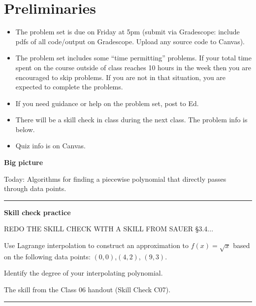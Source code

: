 \documentclass[12pt,letterpaper,noanswers]{exam}
\begin{document}
 \pdfpageheight 11in 
  \pdfpagewidth 8.5in

\noindent 

\section*{Preliminaries}

\begin{itemize}
\itemsep0pt
\item The problem set is due on Friday at 5pm (submit via Gradescope: include pdfs of all code/output on Gradescope.  Upload any source code to Canvas).
\item The problem set includes some ``time permitting'' problems.  If your total time spent on the course outside of class reaches 10 hours in the week then you are encouraged to skip problems.  If you are not in that situation, you are expected to complete the problems.
\item If you need guidance or help on the problem set, post to Ed.
\item There will be a skill check in class during the next class.  The problem info is below.
\item Quiz info is on Canvas.
\end{itemize}



\noindent\textbf{Big picture}

Today: Algorithms for finding a piecewise polynomial that directly passes through data points.

\vspace{0.2cm}
\hrule
\vspace{0.2cm}

\noindent \textbf{Skill check practice}
\begin{questions}
\item 
REDO THE SKILL CHECK WITH A SKILL FROM SAUER \S 3.4...

Use Lagrange interpolation to construct an approximation to $f(x) = \sqrt{x}$ based on the following data points: $(0,0)$,$(4,2)$, $(9,3)$.

Identify the degree of your interpolating polynomial.

\item The skill from the Class 06 handout (Skill Check C07).
\end{questions}


\vspace{0.2cm}
\hrule
\vspace{0.2cm}
\end{document}
